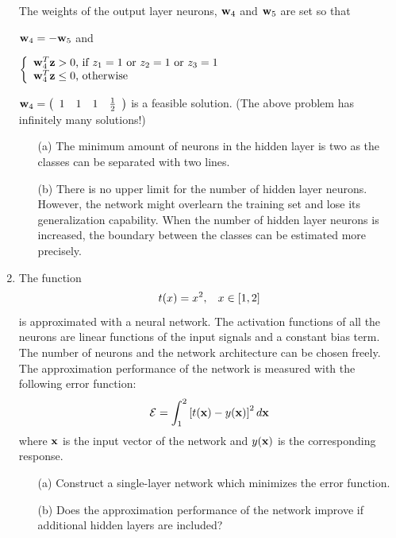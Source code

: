 \begin{enumerate}
\begin{solution}
    The weights of the output layer neurons,
    ${\bf{w}}_4$ and ${\bf{w}}_5$ are set so that

    ${\bf{w}}_4=-{\bf{w}}_5$ and

    $\left\{\begin{array}{l}
        {\bf{w}}_4^T{\bf{z}} > 0 \mbox{, if } z_1=1 \mbox{ or } z_2=1 \mbox{
          or } z_3=1\\
        {\bf{w}}_4^T{\bf{z}} \leq 0 \mbox{, otherwise}
      \end{array}\right.$

    ${\bf{w}}_4=\left(\begin{array}{cccc}1&1&1&\frac{1}{2}\end{array}\right)$ is a feasible solution. (The above problem has infinitely many solutions!)
    \begin{enumerate}
    \item[(a)] The minimum amount of neurons in the hidden layer is two as the classes can be separated with two lines.
    \item[(b)] There is no upper limit for the number of hidden layer
      neurons. However, the network might overlearn the training set and
      lose its generalization capability. When the number of hidden layer
      neurons is increased, the boundary between the classes can be
      estimated more precisely.
    \end{enumerate}


  \end{solution}
  
\item The function
  \[
  t(x) = x^2, \hspace{3mm} x \in \left[ 1, 2 \right]
  \]
  is approximated with a neural network. The activation functions of all
  the neurons are linear functions of the input signals and a constant
  bias term. The number of neurons and the network architecture can be
  chosen freely. The approximation performance of the network is
  measured with the following error function:
  \[
  \mathcal{E} = \int_{1}^2 \left[ t({\bf x})-y({\bf x}) \right]^2 d{\bf x}
  \]
  where ${\bf{x}}$ is the input vector of the network and $y({\bf{x}})$ is the
  corresponding response.
  \begin{itemize}
  \item[(a)] Construct a single-layer network which minimizes the error function.
  \item[(b)] Does the approximation performance of the network improve if
    additional hidden layers are included?
  \end{itemize}


\end{enumerate}
